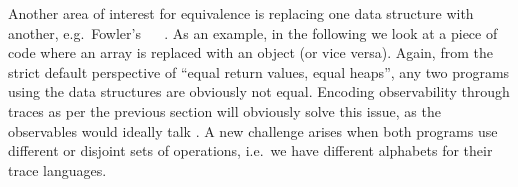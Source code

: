 Another area of interest for equivalence is replacing one data structure with another,
e.g.\ Fowler's ~\cite[p.186]{fowler:refactoring} ~\cite{fowler:refactoring2nd}.
As an example, in the following we look at a piece of code where an array is replaced with an object (or vice versa).
Again, from the strict default perspective of ``equal return values, equal heaps'', any two programs using the data structures are obviously not equal.
Encoding observability through traces as per the previous section will obviously solve this issue, as the observables would ideally talk .
A new challenge arises when both programs use different or disjoint sets of operations, i.e.\ we have different alphabets for their trace languages.




